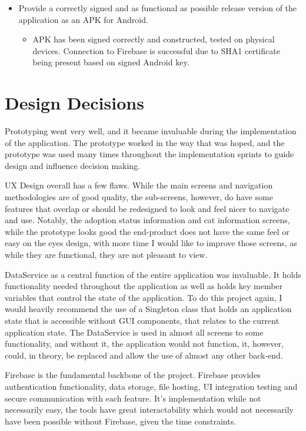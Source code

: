 \begin{itemize}
    \item Provide a correctly signed and as functional as possible release version of the application as an APK for Android.
    \begin{itemize}
        \item APK has been signed correctly and constructed, tested on physical devices. Connection to Firebase is successful due to SHA1 certificate being present based on signed Android key.
    \end{itemize}
    
\end{itemize}

\section{Design Decisions}

Prototyping went very well, and it became invaluable during the implementation of the application. The prototype worked in the way that was hoped, and the prototype was used many times throughout the implementation sprints to guide design and influence decision making. 

UX Design overall has a few flaws. While the main screens and navigation methodologies are of good quality, the sub-screens, however, do have some features that overlap or should be redesigned to look and feel nicer to navigate and use. Notably, the adoption status information and cat information screens, while the prototype looks good the end-product does not have the same feel or easy on the eyes design, with more time I would like to improve those screens, as while they are functional, they are not pleasant to view.

DataService as a central function of the entire application was invaluable. It holds functionality needed throughout the application as well as holds key member variables that control the state of the application. To do this project again, I would heavily recommend the use of a Singleton class that holds an application state that is accessible without GUI components, that relates to the current application state. The DataService is used in almost all screens to some functionality, and without it, the application would not function, it, however, could, in theory, be replaced and allow the use of almost any other back-end.

Firebase is the fundamental backbone of the project. Firebase provides authentication functionality, data storage, file hosting, UI integration testing and secure communication with each feature. It's implementation while not necessarily easy, the tools have great interactability which would not necessarily have been possible without Firebase, given the time constraints.

